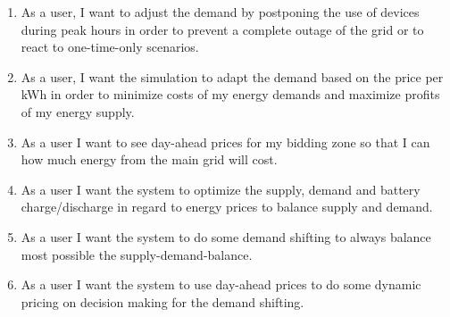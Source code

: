 \begin{enumerate}
\item As a user, I want to adjust the demand by postponing the use of devices during peak hours in order to prevent a complete outage of the grid or to react to one-time-only scenarios.

\item As a user, I want the simulation to adapt the demand based on the price per kWh in order to minimize costs of my energy demands and maximize profits of my energy supply.

\item As a user I want to see day-ahead prices for my bidding zone so that I can how much energy from the main grid will cost.

\item As a user I want the system to optimize the supply, demand and battery charge/discharge in regard to energy prices to balance supply and demand.

\item As a user I want the system to do some demand shifting to always balance most possible the supply-demand-balance.

\item As a user I want the system to use day-ahead prices to do some dynamic pricing on decision making for the demand shifting.

\end{enumerate}

